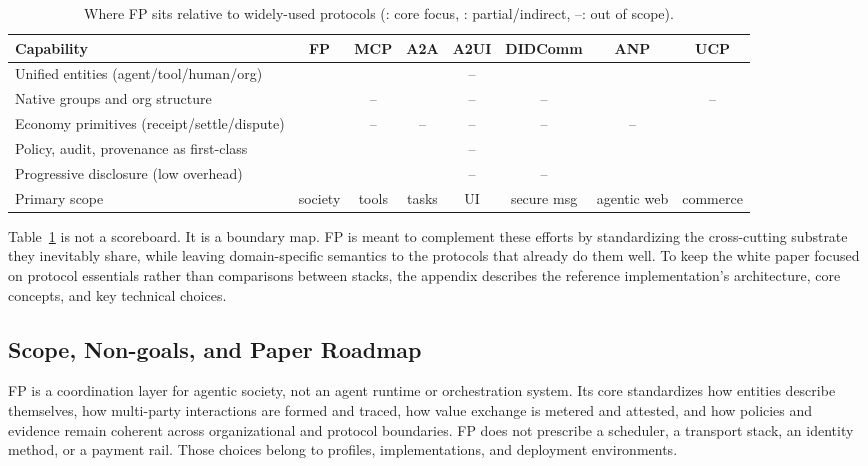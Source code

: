 \documentclass{llmxive}
\providecommand{\full}{\ding{51}}
\providecommand{\pmark}{\raisebox{0.2ex}{\small$\circ$}}
\providecommand{\none}{--}
\begin{document}
\begin{table}[!ht]
\centering
\footnotesize
\begin{tabular}{@{}p{}ccccccc@{}}
\toprule
\textbf{Capability} & \textbf{FP} & \textbf{MCP} & \textbf{A2A} & \textbf{A2UI} & \textbf{DIDComm} & \textbf{ANP} & \textbf{UCP}\\
\midrule
Unified entities (agent/tool/human/org) & \full & \pmark & \pmark & \none & \pmark & \pmark & \pmark \\
Native groups and org structure & \full & \none & \pmark & \none & \none & \pmark & \none \\
Economy primitives (receipt/settle/dispute) & \full & \none & \none & \none & \none & \none & \pmark \\
Policy, audit, provenance as first-class & \full & \pmark & \pmark & \none & \pmark & \pmark & \pmark \\
Progressive disclosure (low overhead) & \full & \pmark & \pmark & \none & \none & \pmark & \pmark \\
Primary scope & society & tools & tasks & UI & secure msg & agentic web & commerce \\
\bottomrule
\end{tabular}
\caption{Where FP sits relative to widely-used protocols (\full: core focus, \pmark: partial/indirect, \none: out of scope).}
\label{tab:comparison}
\end{table}

Table~\ref{tab:comparison} is not a scoreboard. It is a boundary map. FP is meant to complement these efforts by standardizing the cross-cutting substrate they inevitably share, while leaving domain-specific semantics to the protocols that already do them well. To keep the white paper focused on protocol essentials rather than comparisons between stacks, the appendix describes the reference implementation's architecture, core concepts, and key technical choices.



\subsection{Scope, Non-goals, and Paper Roadmap}
\label{subsec:scope}

FP is a coordination layer for agentic society, not an agent runtime or orchestration system. Its core standardizes how entities describe themselves, how multi-party interactions are formed and traced, how value exchange is metered and attested, and how policies and evidence remain coherent across organizational and protocol boundaries. FP does not prescribe a scheduler, a transport stack, an identity method, or a payment rail. Those choices belong to profiles, implementations, and deployment environments.
\end{document}
